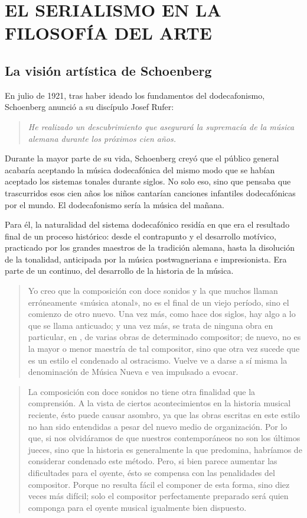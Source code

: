 	\chapter{EL SERIALISMO EN LA FILOSOFÍA DEL ARTE}
    \section{La visión artística de Schoenberg}
    En julio de 1921, tras haber ideado los fundamentos del dodecafonismo, Schoenberg anunció a su discípulo Josef Rufer: \begin{quote}\emph{He realizado un descubrimiento que asegurará la supremacía de la música alemana durante los próximos cien años.}\end{quote}Durante la mayor parte de su vida, Schoenberg creyó que el público general acabaría aceptando la música dodecafónica del mismo modo que se habían aceptado los sistemas tonales durante siglos. No solo eso, sino que pensaba que trascurridos esos cien años los niños cantarían canciones infantiles dodecafónicas por el mundo. El dodecafonismo sería la música del mañana.
    
    Para él, la naturalidad del sistema dodecafónico residía en que era el resultado final de un proceso histórico: desde el contrapunto y el desarrollo motívico, practicado por los grandes maestros de la tradición alemana, hasta la disolución de la tonalidad, anticipada por la música postwagneriana e impresionista. Era parte de un continuo, del desarrollo de la historia de la música.
    
    \begin{quote}
    	Yo creo que la composición con doce sonidos y la que muchos llaman erróneamente «música atonal», no es el final de un viejo período, sino el comienzo de otro nuevo. Una vez más, como hace dos siglos, hay algo a lo que se llama anticuado; y una vez más, se trata de ninguna obra en particular, en , de varias obras de determinado compositor; de nuevo, no es la mayor o menor maestría de tal compositor, sino que otra vez sucede que es un estilo el condenado al ostracismo. Vuelve ve a darse a sí misma la denominación de Música Nueva e vea impulsado a evocar.
    \end{quote}

	\begin{quote}
		La composición con doce sonidos no tiene otra finalidad que la comprensión. A la vista de ciertos acontecimientos en la historia musical reciente, ésto puede causar asombro, ya que las obras escritas en este estilo no han sido entendidas a pesar del nuevo medio de organización. Por lo que, si nos olvidáramos de que nuestros contemporáneos no son los últimos jueces, sino que la historia es generalmente la que predomina, habríamos de considerar condenado este método. Pero, si bien parece aumentar las dificultades para el oyente, ésto se compensa con las penalidades del compositor. Porque no resulta fácil el componer de esta forma, sino diez veces más difícil; solo el compositor perfectamente preparado será quien componga para el oyente musical igualmente bien dispuesto.
	\end{quote}
    
